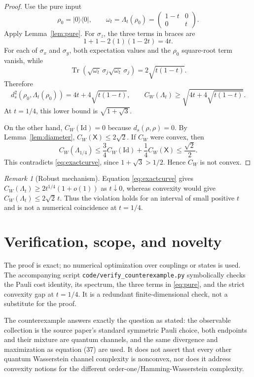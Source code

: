 \documentclass[11pt]{article}
\theoremstyle{remark}
\newtheorem{remark}{Remark}
\newcommand{\id}{\mathrm{Id}}
\newcommand{\tr}{\operatorname{Tr}}
\begin{document}
\begin{proof}
Use the pure input
\[
 \rho_0=|0\rangle\langle0|,
 \qquad
 \omega_t=\Lambda_t(\rho_0)
 =\begin{pmatrix}1-t&0\\0&t\end{pmatrix}.
\]
Apply Lemma~\ref{lem:pure}.  For $\sigma_z$, the three terms in braces are
\[
 1+1-2(1)(1-2t)=4t.
\]
For each of $\sigma_x$ and $\sigma_y$, both expectation values and the
$\rho_0$ square-root term vanish, while
\[
 \tr(\sqrt{\omega_t}\,\sigma_j\sqrt{\omega_t}\,\sigma_j)
 =2\sqrt{t(1-t)}.
\]
Therefore
\begin{equation}\label{eq:exactcurve}
 d_s^2(\rho_0,\Lambda_t(\rho_0))
 =4t+4\sqrt{t(1-t)},
\qquad
 C_W(\Lambda_t)\geq
 \sqrt{4t+4\sqrt{t(1-t)}}.
\end{equation}
At $t=1/4$, this lower bound is $\sqrt{1+\sqrt3}$.

On the other hand, $C_W(\id)=0$ because $d_s(\rho,\rho)=0$.  By
Lemma~\ref{lem:diameter}, $C_W(\mathsf X)\leq2\sqrt2$.  If $C_W$ were convex,
then
\[
 C_W(\Lambda_{1/4})
 \leq\frac34C_W(\id)+\frac14C_W(\mathsf X)
 \leq\frac{\sqrt2}{2}.
\]
This contradicts \eqref{eq:exactcurve}, since
$1+\sqrt3>1/2$.  Hence $C_W$ is not convex.
\end{proof}

\begin{remark}[Robust mechanism]
Equation \eqref{eq:exactcurve} gives
$C_W(\Lambda_t)\geq2t^{1/4}(1+o(1))$ as $t\downarrow0$, whereas convexity
would give $C_W(\Lambda_t)\leq2\sqrt2\,t$.  Thus the violation holds for an
interval of small positive $t$ and is not a numerical coincidence at
$t=1/4$.
\end{remark}

\section{Verification, scope, and novelty}

The proof is exact; no numerical optimization over couplings or states is
used.  The accompanying script \texttt{code/verify\_counterexample.py}
symbolically checks the Pauli cost identity, its spectrum, the three terms in
\eqref{eq:pure}, and the strict convexity gap at $t=1/4$.  It is a redundant
finite-dimensional check, not a substitute for the proof.

The counterexample answers exactly the question as stated: the observable
collection is the source paper's standard symmetric Pauli choice, both
endpoints and their mixture are quantum channels, and the same divergence
and maximization as equation (37) are used.  It does not assert that every
other quantum Wasserstein channel complexity is nonconvex, nor does it address
convexity notions for the different order-one/Hamming-Wasserstein complexity.
\end{document}
